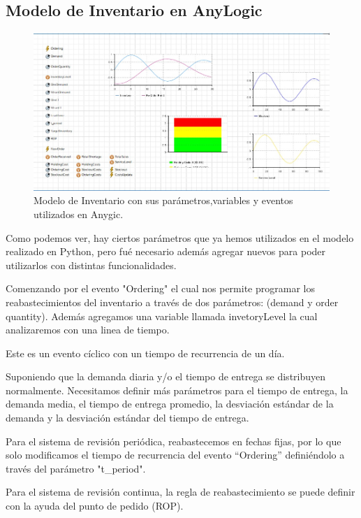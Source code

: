 \subsection{Modelo de Inventario en AnyLogic}
\label{subsec:modelo-de-inventario-en-anylogic}
\begin{figure}[H]
    \includegraphics[width=\linewidth]{images/anylogic-inventario}
    \caption{Modelo de Inventario con sus parámetros,variables y eventos utilizados en Anygic.}
\end{figure}

Como podemos ver, hay ciertos parámetros que ya hemos utilizados en el modelo realizado en Python, pero fué necesario además agregar nuevos para poder utilizarlos con distintas funcionalidades.

Comenzando por el evento "Ordering" el cual nos permite programar los reabastecimientos del inventario a través de dos parámetros: (demand y order quantity). Además agregamos una variable llamada invetoryLevel la cual analizaremos con una linea de tiempo.

Este es un evento cíclico con un tiempo de recurrencia de un día.

Suponiendo que la demanda diaria y/o el tiempo de entrega se distribuyen normalmente.
Necesitamos definir más  parámetros para el tiempo de entrega, la demanda media, el tiempo de entrega promedio, la desviación estándar de la demanda y la desviación estándar del tiempo de entrega.

Para el sistema de revisión periódica, reabastecemos en fechas fijas, por lo que solo modificamos el tiempo de recurrencia del evento “Ordering” definiéndolo a través del parámetro "t\_period".

Para el sistema de revisión continua, la regla de reabastecimiento se puede definir con la ayuda del punto de pedido (ROP).


